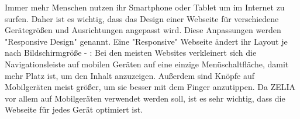 
Immer mehr Menschen nutzen ihr Smartphone oder Tablet um im Internet zu surfen. Daher ist es wichtig, dass das Design einer Webseite für verschiedene Gerätegrößen und Ausrichtungen angepasst wird. Diese Anpassungen werden "Responsive Design" genannt. Eine "Responsive" Webseite ändert ihr Layout je nach Bildschirmgröße - \zb: Bei den meisten Websites verkleinert sich die Navigationsleiste auf mobilen Geräten auf eine einzige Menüschaltfläche, damit mehr Platz ist, um den Inhalt anzuzeigen. Außerdem sind Knöpfe auf Mobilgeräten meist größer, um sie besser mit dem Finger anzutippen. Da ZELIA vor allem auf Mobilgeräten verwendet werden soll, ist es sehr wichtig, dass die Webseite für jedes Gerät optimiert ist. 

